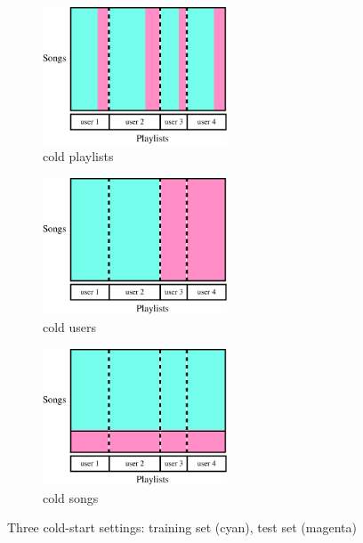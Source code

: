 \begin{figure}[!t]
    \centering
    \begin{subfigure}[t]{2.3in}
        \centering
        \includegraphics[height=1.6in]{fig/cp.pdf}
        \caption{cold playlists}
    \end{subfigure}
    \begin{subfigure}[t]{2.3in}
        \centering
        \includegraphics[height=1.6in]{fig/cu.pdf}
        \caption{cold users}
    \end{subfigure}
    \begin{subfigure}[t]{2.3in}
        \centering
        \includegraphics[height=1.6in]{fig/cs.pdf}
        \caption{cold songs}
    \end{subfigure}
    \caption{Three cold-start settings: training set (cyan), test set (magenta)}
\end{figure}
